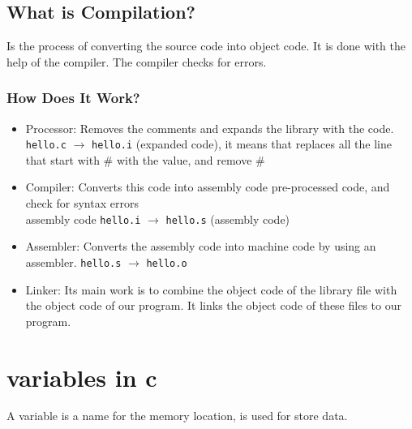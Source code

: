      
    \subsection{What is Compilation?}
         Is the process of converting the source code into object code. It is done with the help of the compiler. The compiler checks for errors.
        \newpage
            \subsubsection{How Does It Work?}
                \begin{itemize}
                    \item Processor: Removes the comments and expands the library with the code. \texttt{hello.c} $\rightarrow$ \texttt{hello.i} (expanded code), it means that replaces all the line that start with \# with the value, and remove \#
                    \item Compiler: Converts this code into assembly code pre-processed code, and check for syntax errors\\
                    assembly code \texttt{hello.i} $\rightarrow$ \texttt{hello.s} (assembly code)
                    \item Assembler: Converts the assembly code into machine code by using an assembler. \texttt{hello.s} $\rightarrow$ \texttt{hello.o}
                    \item Linker: Its main work is to combine the object code of the library file with the object code of our program. It links the object code of these files to our program.
                \end{itemize}
                
    \section{variables in c}
        A variable is a name for the memory location, is used for store data.
